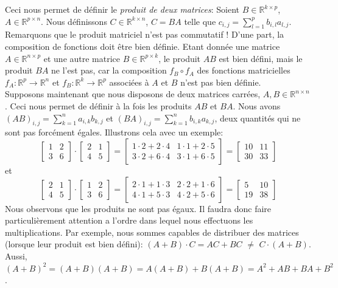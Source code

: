 \documentclass{article}
\newcommand{\R}{\mathbb{R}}
\newcommand{\cross}{\times}
\begin{document}
\noindent Ceci nous permet de définir le \textit{produit de deux matrices}: Soient $B \in \R^{k \cross p}$, $A \in \R^{p \cross n}$. Nous définissons $C \in \R^{k \cross n}$, $C = BA$ telle que $\displaystyle c_{i,j} = \sum_{l=1}^{p} b_{i,l} a_{l,j}$. \\

\noindent Remarquons que le produit matriciel n'est pas commutatif ! D'une part, la composition de fonctions doit être bien définie. Etant donnée une matrice $A \in \R^{n \cross p}$ et une autre matrice $B \in \R^{p \cross k}$, le produit $AB$ est bien défini, mais le produit $BA$ ne l'est pas, car la composition $f_B \circ f_A$ des fonctions matricielles $f_A: \R^p \to \R^n$ et $f_B: \R^k \to \R^p$ associées à $A$ et $B$ n'est pas bien définie.\\

\noindent Supposons maintenant que nous disposons de deux matrices carrées, $A, B \in \R^{n \cross n}$. Ceci nous permet de définir à la fois les produits $AB$ et $BA$. Nous avons $\displaystyle (AB)_{i,j} = \sum_{k=1}^{n} a_{i,k} b_{k,j}$ et $\displaystyle (BA)_{i,j} = \sum_{k=1}^{n} b_{i,k} a_{k,j}$, deux quantités qui ne sont pas forcément égales. Illustrons cela avec un exemple:
$$\begin{bmatrix} 1 & 2 \\ 3 & 6 \end{bmatrix} \cdot \begin{bmatrix} 2 & 1 \\ 4 & 5 \end{bmatrix} = \begin{bmatrix} 1\cdot 2 + 2 \cdot 4 & 1\cdot 1 + 2\cdot 5 \\ 3\cdot 2 + 6\cdot 4 & 3\cdot 1 + 6\cdot 5 \end{bmatrix} = \begin{bmatrix} 10 & 11 \\ 30 & 33 \end{bmatrix}$$
et
$$\begin{bmatrix} 2 & 1 \\ 4 & 5 \end{bmatrix} \cdot \begin{bmatrix} 1 & 2 \\ 3 & 6 \end{bmatrix} = \begin{bmatrix} 2\cdot 1 + 1\cdot 3 & 2\cdot 2 + 1\cdot 6 \\ 4\cdot 1 + 5\cdot 3 & 4\cdot 2 + 5\cdot 6 \end{bmatrix} = \begin{bmatrix} 5 & 10 \\ 19 & 38 \end{bmatrix}$$
Nous observons que les produits ne sont pas égaux. Il faudra donc faire particulièrement attention a l'ordre dans lequel nous effectuons les multiplications. Par exemple, nous sommes capables de distribuer des matrices (lorsque leur produit est bien défini): $(A+B) \cdot C = AC + BC$ \textbf{$\neq$} $C \cdot (A+B)$. Aussi, $(A+B)^2 = (A+B)(A+B) = A(A+B) + B(A+B) = A^2 + AB + BA + B^2$.\\
\end{document}
